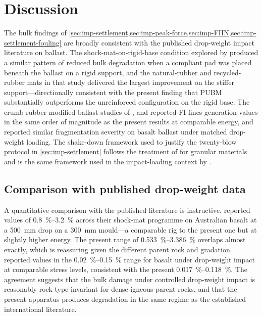 \section{Discussion}
\label{sec:imp-discussion}

The bulk findings of
\cref{sec:imp-settlement,sec:imp-peak-force,sec:imp-FIIN,sec:imp-settlement-fouling}
are broadly consistent with the published drop-weight impact literature on
ballast. The shock-mat-on-rigid-base condition explored by
\citet{Nimbalkar2012} produced a similar pattern of reduced bulk
degradation when a compliant pad was placed beneath the ballast on a rigid
support, and the natural-rubber and recycled-rubber mats in that study
delivered the largest improvement on the stiffer support---directionally
consistent with the present finding that \gls{PUBM} substantially
outperforms the unreinforced configuration on the rigid base. The
crumb-rubber-modified ballast studies of \citet{Koohmishi2021},
\citet{Koohmishi2022} and \citet{Zhang2023} reported FI fines-generation
values in the same order of magnitude as the present \PoneM{} results at
comparable energy, and \citet{Koohmishi2020} reported similar fragmentation
severity on basalt ballast under matched drop-weight loading. The
shake-down framework used to justify the twenty-blow protocol in
\cref{sec:imp-settlement} follows the treatment of \citet{Werkmeister2001}
for granular materials and is the same framework used in the
impact-loading context by \citet{Nimbalkar2012}.

\subsection{Comparison with published drop-weight data}

A quantitative comparison with the published literature is instructive.
\citet{Nimbalkar2012} reported \FIIN{} values of
\SIrange{0.8}{3.2}{\percent} across their shock-mat programme on
Australian basalt at a \SI{500}{\milli\metre} drop on a
\SI{300}{\milli\metre} mould---a comparable rig to the present one but
at slightly higher energy. The present range of
\SIrange{0.533}{3.386}{\percent} overlaps almost exactly, which is
reassuring given the different parent rock and gradation.
\citet{Koohmishi2020} reported \PoneM{} values in the
\SIrange{0.02}{0.15}{\percent} range for basalt under drop-weight impact
at comparable stress levels, consistent with the present
\SIrange{0.017}{0.118}{\percent}. The agreement suggests that the bulk
damage under controlled drop-weight impact is reasonably
rock-type-invariant for dense igneous parent rocks, and that the present
apparatus produces degradation in the same regime as the established
international literature.

